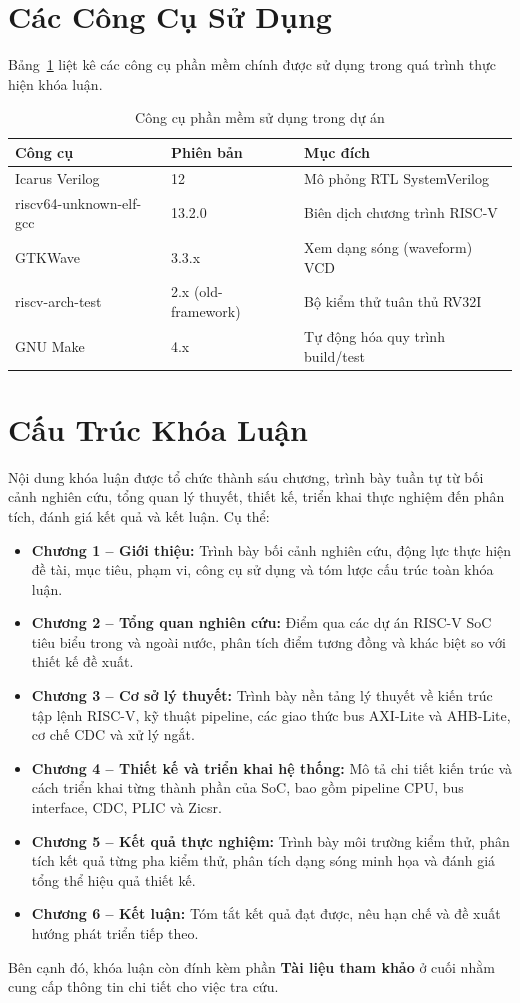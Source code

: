 \section{Các Công Cụ Sử Dụng}

Bảng~\ref{tab:tools} liệt kê các công cụ phần mềm chính được sử dụng trong quá trình thực hiện khóa luận.

\begin{table}[htbp]
\caption{Công cụ phần mềm sử dụng trong dự án}
\label{tab:tools}
\begin{center}
\begin{tabular}{|l|l|l|}
\hline
\textbf{Công cụ} & \textbf{Phiên bản} & \textbf{Mục đích} \\ \hline
Icarus Verilog & 12 & Mô phỏng RTL SystemVerilog \\ \hline
riscv64-unknown-elf-gcc & 13.2.0 & Biên dịch chương trình RISC-V \\ \hline
GTKWave & 3.3.x & Xem dạng sóng (waveform) VCD \\ \hline
riscv-arch-test & 2.x (old-framework) & Bộ kiểm thử tuân thủ RV32I \\ \hline
GNU Make & 4.x & Tự động hóa quy trình build/test \\ \hline
\end{tabular}
\end{center}
\end{table}

\section{Cấu Trúc Khóa Luận}

Nội dung khóa luận được tổ chức thành sáu chương, trình bày tuần tự từ bối cảnh nghiên cứu, tổng quan lý thuyết, thiết kế, triển khai thực nghiệm đến phân tích, đánh giá kết quả và kết luận. Cụ thể:

\begin{itemize}
    \item \textbf{Chương 1 -- Giới thiệu:} Trình bày bối cảnh nghiên cứu, động lực thực hiện đề tài, mục tiêu, phạm vi, công cụ sử dụng và tóm lược cấu trúc toàn khóa luận.
    \item \textbf{Chương 2 -- Tổng quan nghiên cứu:} Điểm qua các dự án RISC-V SoC tiêu biểu trong và ngoài nước, phân tích điểm tương đồng và khác biệt so với thiết kế đề xuất.
    \item \textbf{Chương 3 -- Cơ sở lý thuyết:} Trình bày nền tảng lý thuyết về kiến trúc tập lệnh RISC-V, kỹ thuật pipeline, các giao thức bus AXI-Lite và AHB-Lite, cơ chế CDC và xử lý ngắt.
    \item \textbf{Chương 4 -- Thiết kế và triển khai hệ thống:} Mô tả chi tiết kiến trúc và cách triển khai từng thành phần của SoC, bao gồm pipeline CPU, bus interface, CDC, PLIC và Zicsr.
    \item \textbf{Chương 5 -- Kết quả thực nghiệm:} Trình bày môi trường kiểm thử, phân tích kết quả từng pha kiểm thử, phân tích dạng sóng minh họa và đánh giá tổng thể hiệu quả thiết kế.
    \item \textbf{Chương 6 -- Kết luận:} Tóm tắt kết quả đạt được, nêu hạn chế và đề xuất hướng phát triển tiếp theo.
\end{itemize}

Bên cạnh đó, khóa luận còn đính kèm phần \textbf{Tài liệu tham khảo} ở cuối nhằm cung cấp thông tin chi tiết cho việc tra cứu.

